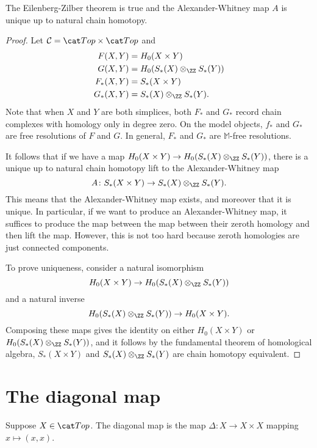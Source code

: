 \documentclass{standalone}
\begin{document}
\begin{corollary}
  The Eilenberg-Zilber theorem is true and
  the Alexander-Whitney map \(A\) is unique up to natural chain homotopy.
\end{corollary}
\begin{proof}
  Let \(\mathcal C = \cTop \times \cTop\) and
  \begin{align*}
    F(X, Y) &= H_0(X \times Y) \\
    G(X, Y) &= H_0(S_*(X) \otimes_\ZZ S_*(Y)) \\
    F_*(X, Y) &= S_*(X \times Y) \\
    G_*(X, Y) &= S_*(X) \otimes_\ZZ S_*(Y).
  \end{align*}
  Note that when \(X\) and \(Y\) are both simplices,
  both \(F_*\) and \(G_*\) record chain complexes
  with homology only in degree zero.
  On the model objects, \(f_*\) and \(G_*\) are
  free resolutions of \(F\) and \(G\).
  In general, \(F_*\) and \(G_*\) are \(\mathbb M\)-free resolutions.

  It follows that if we have a map
  \(H_0(X \times Y) \to H_0(S_*(X) \otimes_\ZZ S_*(Y))\),
  there is a unique up to natural chain homotopy lift to
  the Alexander-Whitney map
  \[
    A \colon S_*(X \times Y) \to S_*(X) \otimes_\ZZ S_*(Y).
  \]
  This means that the Alexander-Whitney map exists,
  and moreover that it is unique.
  In particular, if we want to produce an Alexander-Whitney map,
  it suffices to produce the map between the map between their zeroth
  homology and then lift the map.
  However, this is not too hard because zeroth homologies
  are just connected components.

  To prove uniqueness, consider a natural isomorphism
  \[
    H_0(X \times Y) \to H_0(S_*(X) \otimes_\ZZ S_*(Y))
  \]
  and a natural inverse
  \[
    H_0(S_*(X) \otimes_\ZZ S_*(Y)) \to H_0(X \times Y).
  \]
  Composing these maps gives the identity on either
  \(H_0(X \times Y)\) or \(H_0(S_*(X) \otimes_\ZZ S_*(Y))\),
  and it follows by the fundamental theorem of homological algebra,
  \(S_*(X \times Y)\) and \(S_*(X) \otimes_\ZZ S_*(Y)\)
  are chain homotopy equivalent.
\end{proof}

\section{The diagonal map}
Suppose \(X \in \cTop\).
The diagonal map is the map \(\Delta \colon X \to X \times X\)
mapping \(x \mapsto (x, x)\).
\end{document}
